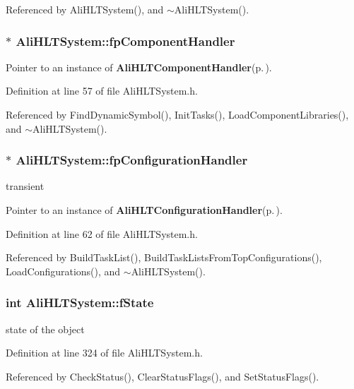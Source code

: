 Referenced by Ali\-HLTSystem(), and $\sim$Ali\-HLTSystem().
\subsubsection{$\ast$ {\bf Ali\-HLTSystem::fp\-Component\-Handler}}\label{classAliHLTSystem_o0}


Pointer to an instance of {\bf Ali\-HLTComponent\-Handler}{\rm (p.\,\pageref{classAliHLTComponentHandler})}. 

Definition at line 57 of file Ali\-HLTSystem.h.

Referenced by Find\-Dynamic\-Symbol(), Init\-Tasks(), Load\-Component\-Libraries(), and $\sim$Ali\-HLTSystem().
\subsubsection{$\ast$ {\bf Ali\-HLTSystem::fp\-Configuration\-Handler}}\label{classAliHLTSystem_o1}


transient 

Pointer to an instance of {\bf Ali\-HLTConfiguration\-Handler}{\rm (p.\,\pageref{classAliHLTConfigurationHandler})}. 

Definition at line 62 of file Ali\-HLTSystem.h.

Referenced by Build\-Task\-List(), Build\-Task\-Lists\-From\-Top\-Configurations(), Load\-Configurations(), and $\sim$Ali\-HLTSystem().
\subsubsection{\setlength{\rightskip}{0pt plus 5cm}int {\bf Ali\-HLTSystem::f\-State}\hspace{0.3cm}{\tt  [private]}}\label{classAliHLTSystem_r1}


state of the object 

Definition at line 324 of file Ali\-HLTSystem.h.

Referenced by Check\-Status(), Clear\-Status\-Flags(), and Set\-Status\-Flags().
